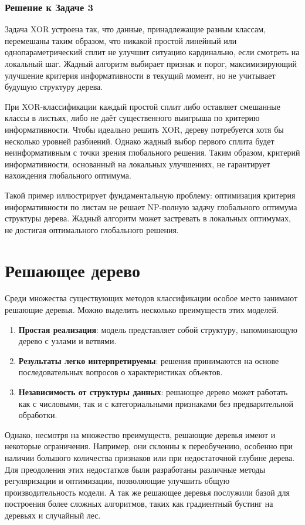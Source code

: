 \subsubsection*{Решение к Задаче 3}

Задача XOR устроена так, что данные, принадлежащие разным классам, перемешаны таким образом, что никакой простой линейный или однопараметрический сплит не улучшит ситуацию кардинально, если смотреть на локальный шаг. Жадный алгоритм выбирает признак и порог, максимизирующий улучшение критерия информативности в текущий момент, но не учитывает будущую структуру дерева.

При XOR-классификации каждый простой сплит либо оставляет смешанные классы в листьях, либо не даёт существенного выигрыша по критерию информативности. Чтобы идеально решить XOR, дереву потребуется хотя бы несколько уровней разбиений. Однако жадный выбор первого сплита будет неинформативным с точки зрения глобального решения. Таким образом, критерий информативности, основанный на локальных улучшениях, не гарантирует нахождения глобального оптимума.

Такой пример иллюстрирует фундаментальную проблему: оптимизация критерия информативности по листам не решает NP-полную задачу глобального оптимума структуры дерева. Жадный алгоритм может застревать в локальных оптимумах, не достигая оптимального глобального решения.


\section{Решающее дерево}
Среди множества существующих методов классификации особое место занимают решающие деревья.
Можно выделить несколько преимуществ этих моделей.
\begin{enumerate}
    \item \textbf{Простая реализация}: модель представляет собой структуру, напоминающую дерево с узлами и ветвями.
    \item \textbf{Результаты легко интерпретируемы}: решения принимаются на основе последовательных вопросов о характеристиках объектов.
    \item \textbf{Независимость от структуры данных}: решающее дерево может работать как с числовыми, так и с категориальными признаками без предварительной обработки.

\end{enumerate}
Однако, несмотря на множество преимуществ, решающие деревья имеют и некоторые ограничения. Например, они склонны к переобучению, особенно при наличии большого количества признаков или при недостаточной глубине дерева.
Для преодоления этих недостатков были разработаны различные методы регуляризации и оптимизации, позволяющие улучшить общую производительность модели. А так же решающее деревья послужили базой для построения более сложных алгоритмов, таких как градиентный бустинг на деревьях и случайный лес.


